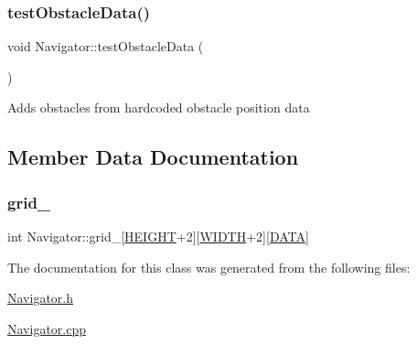 \subsubsection{\texorpdfstring{test\+Obstacle\+Data()}{testObstacleData()}}
{\footnotesize\ttfamily void Navigator\+::test\+Obstacle\+Data (\begin{DoxyParamCaption}{ }\end{DoxyParamCaption})}

Adds obstacles from hardcoded obstacle position data 

\subsection{Member Data Documentation}
\mbox{\label{class_navigator_ad295138915accad1b15031a977f59b3e}} 
\subsubsection{\texorpdfstring{grid\+\_\+}{grid\_}}
{\footnotesize\ttfamily int Navigator\+::grid\+\_\+\mbox{[}\mbox{\hyperlink{_navigator_8h_af728b7647e0b8c49832983a31f9a2e9b}{H\+E\+I\+G\+HT}}+2\mbox{]}\mbox{[}\mbox{\hyperlink{_navigator_8h_a9649ab8139c4c2ea5c93625b30d92a05}{W\+I\+D\+TH}}+2\mbox{]}\mbox{[}\mbox{\hyperlink{_navigator_8h_ace45c8c944a852d4990f5f8f87b2335e}{D\+A\+TA}}\mbox{]}}



The documentation for this class was generated from the following files\+:\begin{DoxyCompactItemize}
\item 
\mbox{\hyperlink{_navigator_8h}{Navigator.\+h}}\item 
\mbox{\hyperlink{_navigator_8cpp}{Navigator.\+cpp}}\end{DoxyCompactItemize}
